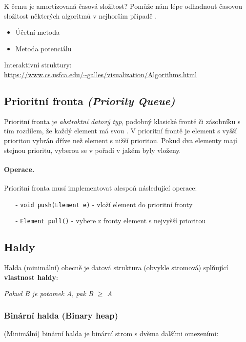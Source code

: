 K čemu je amortizovaná časová složitost? Pomůže nám lépe odhadnout časovou složitost některých algoritmů v nejhorším případě \cite{algoritmyeu:amortizovana}.

\begin{itemize}[itemsep=0pt, topsep=0pt]
    \item Účetní metoda
     \item Metoda potenciálu
\end{itemize}

\noindent Interaktivní struktury: \url{https://www.cs.usfca.edu/~galles/visualization/Algorithms.html}

\subsection{Prioritní fronta \textit{(Priority Queue)}}
Prioritní fronta je \textit{abstraktní datový typ}, podobný klasické frontě či zásobníku s tím rozdílem, že každý element má svou . V prioritní frontě je element s vyšší prioritou vybrán dříve než element s nižší prioritou. Pokud dva elementy mají stejnou prioritu, vyberou se v pořadí v jakém byly vloženy.

\paragraph{Operace.} Prioritní fronta musí implementovat alespoň následující operace:

\begin{itemize}[itemsep=0pt, topsep=2pt]
    \item[-] \texttt{void push(Element e)} - vloží element do prioritní fronty
    \item[-] \texttt{Element pull()} - vybere z fronty element s nejvyšší prioritou
\end{itemize}

\subsection{Haldy}
Halda (minimální) obecně je datová struktura (obvykle stromová) splňující \textbf{vlastnost haldy}:

\begin{center}
    \textit{Pokud B je potomek A, pak B $\geq$ A}
\end{center}

\subsubsection*{Binární halda (Binary heap)}
(Minimální) binární halda je binární strom s dvěma dalšími omezeními:

